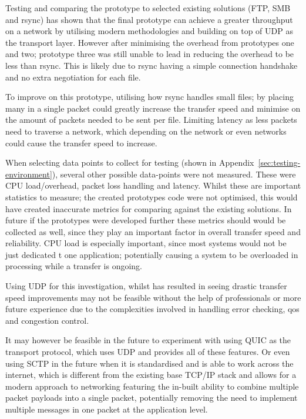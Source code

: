 Testing and comparing the prototype to selected existing solutions (FTP, SMB and rsync) has shown that the final prototype can achieve a greater throughput on a network by utilising modern methodologies and building on top of UDP as the transport layer. However after minimising the overhead from prototypes one and two; prototype three was still unable to lead in reducing the overhead to be less than rsync. This is likely due to rsync having a simple connection handshake and no extra negotiation for each file.

To improve on this prototype, utilising how rsync handles small files; by placing many in a single packet could greatly increase the transfer speed and minimise on the amount of packets needed to be sent per file. Limiting latency as less packets need to traverse a network, which depending on the network or even networks could cause the transfer speed to increase.

When selecting data points to collect for testing (shown in Appendix~\ref{sec:testing-environment}), several other possible data-points were not measured. These were CPU load/overhead, packet loss handling and latency. Whilst these are important statistics to measure; the created prototypes code were not optimised, this would have created inaccurate metrics for comparing against the existing solutions. In future if the prototypes were developed further these metrics should would be collected as well, since they play an important factor in overall transfer speed and reliability. CPU load is especially important, since most systems would not be just dedicated t one application; potentially causing a system to be overloaded in processing while a transfer is ongoing.

Using UDP for this investigation, whilst has resulted in seeing drastic transfer speed improvements may not be feasible without the help of professionals or more future experience due to the complexities involved in handling error checking, \acrfull{qos} and congestion control.

It may however be feasible in the future to experiment with using QUIC as the transport protocol, which uses UDP and provides all of these features. Or even using SCTP in the future when it is standardised and is able to work across the internet, which is different from the existing base TCP/IP stack and allows for a modern approach to networking featuring the in-built ability to combine multiple packet payloads into a single packet, potentially removing the need to implement multiple messages in one packet at the application level.


